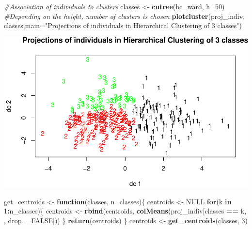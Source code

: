 \documentclass[]{article}
\newenvironment{Shaded}{\begin{snugshade}}{\end{snugshade}}
\newcommand{\KeywordTok}[1]{\textcolor[rgb]{0.13,0.29,0.53}{\textbf{#1}}}
\newcommand{\DataTypeTok}[1]{\textcolor[rgb]{0.13,0.29,0.53}{#1}}
\newcommand{\DecValTok}[1]{\textcolor[rgb]{0.00,0.00,0.81}{#1}}
\newcommand{\StringTok}[1]{\textcolor[rgb]{0.31,0.60,0.02}{#1}}
\newcommand{\CommentTok}[1]{\textcolor[rgb]{0.56,0.35,0.01}{\textit{#1}}}
\newcommand{\OtherTok}[1]{\textcolor[rgb]{0.56,0.35,0.01}{#1}}
\newcommand{\ControlFlowTok}[1]{\textcolor[rgb]{0.13,0.29,0.53}{\textbf{#1}}}
\newcommand{\OperatorTok}[1]{\textcolor[rgb]{0.81,0.36,0.00}{\textbf{#1}}}
\newcommand{\NormalTok}[1]{#1}
\begin{document}
\begin{Shaded}
\begin{Highlighting}[]
\CommentTok{#Association of individuals to clusters}
\NormalTok{classes <-}\StringTok{ }\KeywordTok{cutree}\NormalTok{(hc_ward, }\DataTypeTok{h=}\DecValTok{50}\NormalTok{) }\CommentTok{#Depending on the height, number of clusters is chosen}
\KeywordTok{plotcluster}\NormalTok{(proj_indiv, classes,}\DataTypeTok{main=}\StringTok{"Projections of individuals in Hierarchical Clustering of 3 classes"}\NormalTok{)}
\end{Highlighting}
\end{Shaded}

\includegraphics{project_report_files/figure-latex/unnamed-chunk-11-2.pdf}

\begin{Shaded}
\begin{Highlighting}[]
\NormalTok{get_centroids <-}\StringTok{ }\ControlFlowTok{function}\NormalTok{(classes, n_classes)\{}
\NormalTok{  centroids <-}\StringTok{ }\OtherTok{NULL}
  \ControlFlowTok{for}\NormalTok{(k }\ControlFlowTok{in} \DecValTok{1}\OperatorTok{:}\NormalTok{n_classes)\{}
\NormalTok{    centroids <-}\StringTok{ }\KeywordTok{rbind}\NormalTok{(centroids, }\KeywordTok{colMeans}\NormalTok{(proj_indiv[classes }\OperatorTok{==}\StringTok{ }\NormalTok{k, , }\DataTypeTok{drop =} \OtherTok{FALSE}\NormalTok{]))}
\NormalTok{  \}}
  \KeywordTok{return}\NormalTok{(centroids)}
\NormalTok{\}}
\NormalTok{centroids <-}\StringTok{ }\KeywordTok{get_centroids}\NormalTok{(classes, }\DecValTok{3}\NormalTok{)}
\end{Highlighting}
\end{Shaded}

\begin{Shaded}
\end{Shaded}
\end{document}
